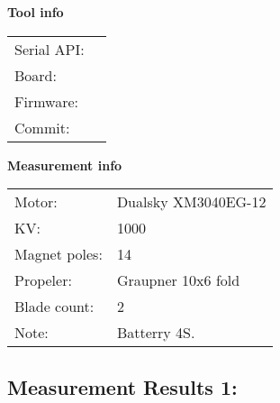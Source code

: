 \documentclass[10pt]{article}
\begin{document}
\noindent
{\large \bf Tool info}
\vspace{3mm}

\noindent
\begin{tabular}{ll}
Serial API:  & \\ 
Board:       & \\ 
Firmware:    & \\ 
Commit:      & 
\end{tabular}
\vspace{3mm}

\noindent
{\large \bf Measurement info}
\vspace{3mm}

\noindent
\begin{tabular}{ll}
Motor:        & Dualsky XM3040EG-12\\ 
KV:           & 1000\\ 
Magnet poles: & 14\\ 
Propeler:     & Graupner 10x6 fold\\ 
Blade count:  & 2\\ 
Note:         & Batterry 4S.
\end{tabular}

\vspace{3mm}


\subsection*{\large \bf Measurement Results 1:}
\end{document}
